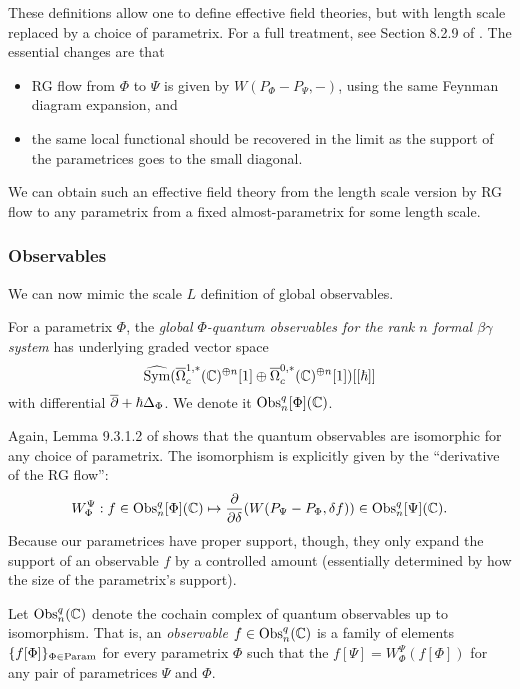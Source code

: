 These definitions allow one to define effective field theories, but with length scale replaced by a choice of parametrix.
For a full treatment, see Section 8.2.9 of \cite{CG}.
The essential changes are that 
\begin{itemize}
\item RG flow from $\Phi$ to $\Psi$ is given by $W(P_\Phi - P_\Psi,-)$, using the same Feynman diagram expansion, and
\item the same local functional should be recovered in the limit as the support of the parametrices goes to the small diagonal.
\end{itemize} 
We can obtain such an effective field theory from the length scale version 
by RG flow to any parametrix from a fixed almost-parametrix for some length scale.

\subsubsection{Observables}

We can now mimic the scale $L$ definition of global observables.

\begin{dfn}
For a parametrix $\Phi$, the  \emph{global $\Phi$-quantum observables for the rank $n$ formal $\beta\gamma$ system} has
underlying graded vector space
\[
\widehat{{\rm Sym}}(\overline{\Omega}_c^{1,*}(\mathbb C)^{\oplus n}[1] \oplus \overline{\Omega}^{0,*}_c(\mathbb C)^{\oplus n}[1])[[\hbar]]
\]
with differential $\overline{\partial} + \hbar \Delta_\Phi$. 
We denote it ${\rm Obs}^q_n[\Phi](\mathbb C)$.
\end{dfn}

Again, Lemma 9.3.1.2 of \cite{CG} shows that the quantum observables are isomorphic for any choice of parametrix.
The isomorphism is explicitly given by the ``derivative of the RG flow'':
\[
W_\Phi^\Psi: f \in {\rm Obs}^q_n[\Phi](\mathbb C) \mapsto \frac{\partial}{\partial \delta}(W(P_\Psi - P_\Phi, \delta f)) \in {\rm Obs}^q_n[\Psi](\mathbb C).
\]
Because our parametrices have proper support, though, they only expand the support of an observable $f$ by a controlled amount 
(essentially determined by how the size of the parametrix's support).

\begin{dfn}
Let ${\rm Obs}^q_n(\mathbb C)$ denote the cochain complex of quantum observables up to isomorphism.
That is, an \emph{observable} $f \in {\rm Obs}^q_n(\mathbb C)$ is a family of elements $\{f[\Phi]\}_{\Phi \in {\rm Param}}$ for every parametrix $\Phi$ 
such that the $f[\Psi] = W_\Phi^\Psi(f[\Phi])$ for any pair of parametrices $\Psi$ and $\Phi$.
\end{dfn}

